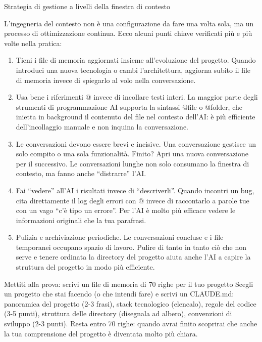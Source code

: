 \begin{center}\small\color{gray}Strategia di gestione a livelli della finestra di contesto\end{center}


L'ingegneria del contesto non è una configurazione da fare una volta sola, ma un processo di ottimizzazione continua. Ecco alcuni punti chiave verificati più e più volte nella pratica:

\begin{enumerate}
  \item Tieni i file di memoria aggiornati insieme all'evoluzione del progetto. Quando introduci una nuova tecnologia o cambi l'architettura, aggiorna subito il file di memoria invece di spiegarlo al volo nella conversazione.
  \item Usa bene i riferimenti @ invece di incollare testi interi. La maggior parte degli strumenti di programmazione AI supporta la sintassi @file o @folder, che inietta in background il contenuto del file nel contesto dell'AI: è più efficiente dell'incollaggio manuale e non inquina la conversazione.
  \item Le conversazioni devono essere brevi e incisive. Una conversazione gestisce un solo compito o una sola funzionalità. Finito? Apri una nuova conversazione per il successivo. Le conversazioni lunghe non solo consumano la finestra di contesto, ma fanno anche “distrarre” l'AI.
  \item Fai “vedere” all'AI i risultati invece di “descriverli”. Quando incontri un bug, cita direttamente il log degli errori con @ invece di raccontarlo a parole tue con un vago “c'è tipo un errore”. Per l'AI è molto più efficace vedere le informazioni originali che la tua parafrasi.
  \item Pulizia e archiviazione periodiche. Le conversazioni concluse e i file temporanei occupano spazio di lavoro. Pulire di tanto in tanto ciò che non serve e tenere ordinata la directory del progetto aiuta anche l'AI a capire la struttura del progetto in modo più efficiente.
\end{enumerate}

\begin{tcbpractice}{Mettiti alla prova: scrivi un file di memoria di 70 righe per il tuo progetto}
Scegli un progetto che stai facendo (o che intendi fare) e scrivi un CLAUDE.md: panoramica del progetto (2-3 frasi), stack tecnologico (elencalo), regole del codice (3-5 punti), struttura delle directory (disegnala ad albero), convenzioni di sviluppo (2-3 punti). Resta entro 70 righe: quando avrai finito scoprirai che anche la tua comprensione del progetto è diventata molto più chiara.

\end{tcbpractice}

